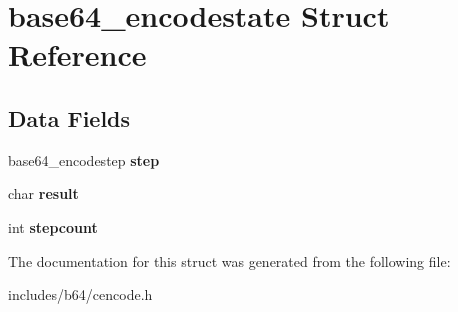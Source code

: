 \hypertarget{structbase64__encodestate}{\section{base64\-\_\-encodestate Struct Reference}
\label{structbase64__encodestate}
}
\subsection*{Data Fields}
\begin{DoxyCompactItemize}
\item 
\hypertarget{structbase64__encodestate_a03379869bcae52baa816bfb820a526d2}{base64\-\_\-encodestep {\bfseries step}}\label{structbase64__encodestate_a03379869bcae52baa816bfb820a526d2}

\item 
\hypertarget{structbase64__encodestate_a53ba5e5a2744d7ec9192157fc755a94d}{char {\bfseries result}}\label{structbase64__encodestate_a53ba5e5a2744d7ec9192157fc755a94d}

\item 
\hypertarget{structbase64__encodestate_abaa3aa9865cb2e6be3da3d466554c0b5}{int {\bfseries stepcount}}\label{structbase64__encodestate_abaa3aa9865cb2e6be3da3d466554c0b5}

\end{DoxyCompactItemize}


The documentation for this struct was generated from the following file\-:\begin{DoxyCompactItemize}
\item 
includes/b64/cencode.\-h\end{DoxyCompactItemize}
